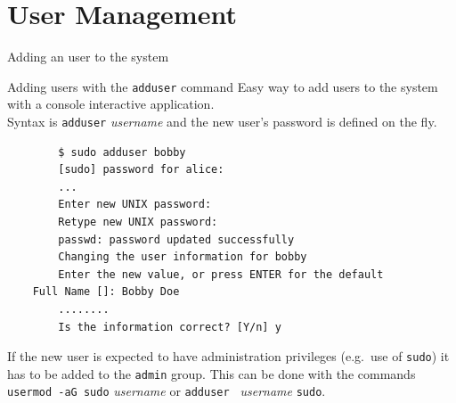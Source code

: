 \section{User Management}
\begin{frame}[t,fragile]{Adding an user to the system}

  \vspace{-0.4cm}
  \begin{block}{Adding users with the \alert{\texttt{adduser}} command}
    {\footnotesize
      Easy way to add users to the system with a console interactive application. \\Syntax is \alert{\texttt{adduser} \emph{username}} and the new user's password is defined on the fly.}
    
    {\scriptsize
      \begin{lstlisting}
        $ sudo adduser bobby
        [sudo] password for alice: 
        ...
        Enter new UNIX password: 
        Retype new UNIX password: 
        passwd: password updated successfully
        Changing the user information for bobby
        Enter the new value, or press ENTER for the default
	Full Name []: Bobby Doe
        ........
        Is the information correct? [Y/n] y
      \end{lstlisting}
    }
    {\footnotesize
If the new user is expected to have administration privileges (e.g.\ use of \texttt{sudo})  it has to be added to the \texttt{admin} group. This can be done with the commands \\ \alert{\texttt{usermod -aG sudo}} \emph{username} or \alert{\texttt{adduser } \emph{username} \texttt{sudo}}.}

  \end{block}
  
\end{frame}
